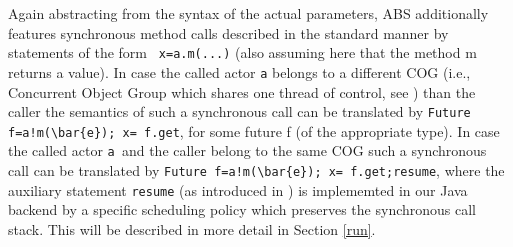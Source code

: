 Again abstracting from the syntax of the actual parameters,
ABS additionally features synchronous method calls described in the standard manner
by  statements of the form  \lstinline| x=a.m(...)| (also assuming here that the method m returns a value).  In case the called actor \lstinline|a| belongs to a different 
COG (i.e., Concurrent Object Group which shares one thread of control, see  \cite{abs})
than the caller the semantics of such  a synchronous call can be translated
by \lstinline|Future f=a!m(\bar{e}); x= f.get|, for some future f (of the appropriate type).
In case the called actor \lstinline|a |and the caller belong to the same COG  such  a synchronous call can be translated by \lstinline|Future f=a!m(\bar{e}); x= f.get;resume|,
where the auxiliary statement \lstinline|resume| (as introduced in \cite{resume})
is implememted in our  Java backend by a specific scheduling policy which preserves the synchronous call stack.
This will be described in more detail in Section \ref{run}.




